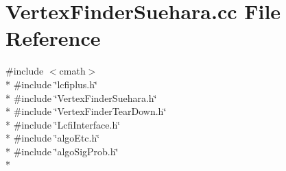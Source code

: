 \section{Vertex\-Finder\-Suehara.\-cc File Reference}
\label{VertexFinderSuehara_8cc}
{\ttfamily \#include $<$cmath$>$}\\*
{\ttfamily \#include \char`\"{}lcfiplus.\-h\char`\"{}}\\*
{\ttfamily \#include \char`\"{}Vertex\-Finder\-Suehara.\-h\char`\"{}}\\*
{\ttfamily \#include \char`\"{}Vertex\-Finder\-Tear\-Down.\-h\char`\"{}}\\*
{\ttfamily \#include \char`\"{}Lcfi\-Interface.\-h\char`\"{}}\\*
{\ttfamily \#include \char`\"{}algo\-Etc.\-h\char`\"{}}\\*
{\ttfamily \#include \char`\"{}algo\-Sig\-Prob.\-h\char`\"{}}\\*
